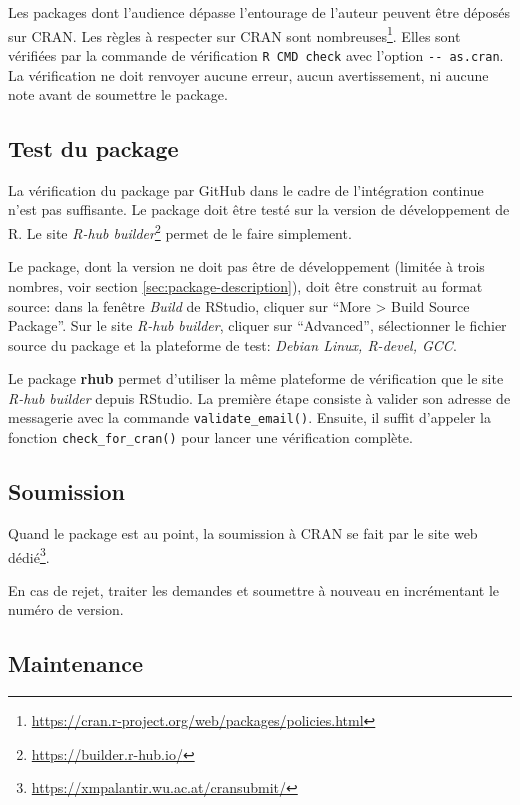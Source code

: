 \documentclass[
  12pt,
  french,
  a4paper,
  extrafontsizes,onecolumn,openright
  ]{memoir}
\begin{document}
Les packages dont l'audience dépasse l'entourage de l'auteur peuvent être déposés sur CRAN.
Les règles à respecter sur CRAN sont nombreuses\footnote{\url{https://cran.r-project.org/web/packages/policies.html}}. Elles sont vérifiées par la commande de vérification \texttt{R\ CMD\ check} avec l'option \texttt{-\/-\ as.cran}.
La vérification ne doit renvoyer aucune erreur, aucun avertissement, ni aucune note avant de soumettre le package.

\subsection{Test du package}\label{test-du-package}

La vérification du package par GitHub dans le cadre de l'intégration continue n'est pas suffisante.
Le package doit être testé sur la version de développement de R.
Le site \emph{R-hub builder}\footnote{\url{https://builder.r-hub.io/}} permet de le faire simplement.

Le package, dont la version ne doit pas être de développement (limitée à trois nombres, voir section \ref{sec:package-description}), doit être construit au format source: dans la fenêtre \emph{Build} de RStudio, cliquer sur \enquote{More \textgreater{} Build Source Package}.
Sur le site \emph{R-hub builder}, cliquer sur \enquote{Advanced}, sélectionner le fichier source du package et la plateforme de test: \emph{Debian Linux, R-devel, GCC}.

Le package \textbf{rhub} permet d'utiliser la même plateforme de vérification que le site \emph{R-hub builder} depuis RStudio.
La première étape consiste à valider son adresse de messagerie avec la commande \texttt{validate\_email()}.
Ensuite, il suffit d'appeler la fonction \texttt{check\_for\_cran()} pour lancer une vérification complète.

\subsection{Soumission}\label{soumission}

Quand le package est au point, la soumission à CRAN se fait par le site web dédié\footnote{\url{https://xmpalantir.wu.ac.at/cransubmit/}}.

En cas de rejet, traiter les demandes et soumettre à nouveau en incrémentant le numéro de version.

\subsection{Maintenance}\label{maintenance}
\end{document}
